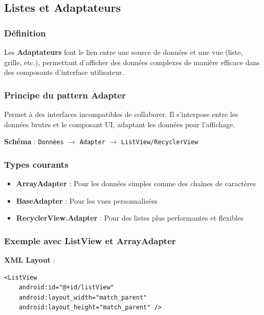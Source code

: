 \documentclass[11pt,a4paper]{article}
\begin{document}
\subsection{Listes et Adaptateurs}

\subsubsection{Définition}

Les \textbf{Adaptateurs} font le lien entre une source de données et une vue (liste, grille, etc.), permettant d'afficher des données complexes de manière efficace dans des composants d'interface utilisateur.

\subsubsection{Principe du pattern Adapter}

Permet à des interfaces incompatibles de collaborer. Il s'interpose entre les données brutes et le composant UI, adaptant les données pour l'affichage.

\textbf{Schéma} : \texttt{Données} $\rightarrow$ \texttt{Adapter} $\rightarrow$ \texttt{ListView/RecyclerView}

\subsubsection{Types courants}

\begin{itemize}
    \item \textbf{ArrayAdapter} : Pour les données simples comme des chaînes de caractères
    \item \textbf{BaseAdapter} : Pour les vues personnalisées
    \item \textbf{RecyclerView.Adapter} : Pour des listes plus performantes et flexibles
\end{itemize}

\subsubsection{Exemple avec ListView et ArrayAdapter}

\textbf{XML Layout} :
\begin{lstlisting}[style=XML]
<ListView
    android:id="@+id/listView"
    android:layout_width="match_parent"
    android:layout_height="match_parent" />
\end{lstlisting}
\end{document}
